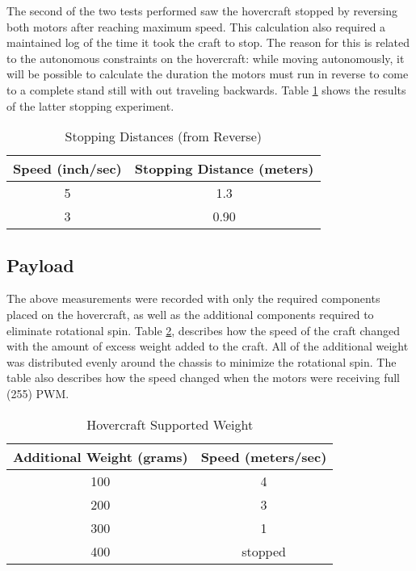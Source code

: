 The second of the two tests performed saw the hovercraft stopped by reversing both motors after reaching maximum speed.  This calculation  also required a maintained log of the time it took the craft to stop. The reason for this is related to the autonomous constraints on the hovercraft: while moving autonomously, it will be possible to calculate the duration the motors must run in reverse to come to a complete stand still with out traveling backwards.  Table \ref{reverseTable} shows the results of the latter stopping experiment. 

\begin{table}
\caption{Stopping Distances (from Reverse)}
\begin{center}
\begin{tabular}{ c c }
  Speed (inch/sec) & Stopping Distance (meters) \\
  \hline
  5 & 1.3 \\
  3 & 0.90 \\
\end{tabular}
\end{center}
\label{reverseTable}
\end{table}

\subsection{Payload}
The above measurements were recorded with only the required components placed on the hovercraft, as well as the additional components required to eliminate rotational spin. Table \ref{weightTable}, describes how the speed of the craft changed with the amount of excess weight added to the craft. All of the additional weight was distributed evenly around the chassis to minimize the rotational spin. The table also describes how the speed changed when the motors were receiving full (255) PWM.
\begin{table}
\caption{Hovercraft Supported Weight}
\begin{center}
\begin{tabular}{ c c }
  Additional Weight (grams) & Speed (meters/sec) \\
  \hline
  100 & 4 \\
  200 & 3 \\
  300 & 1 \\
  400 & stopped \\
\end{tabular}
\end{center}
\label{weightTable}
\end{table}
